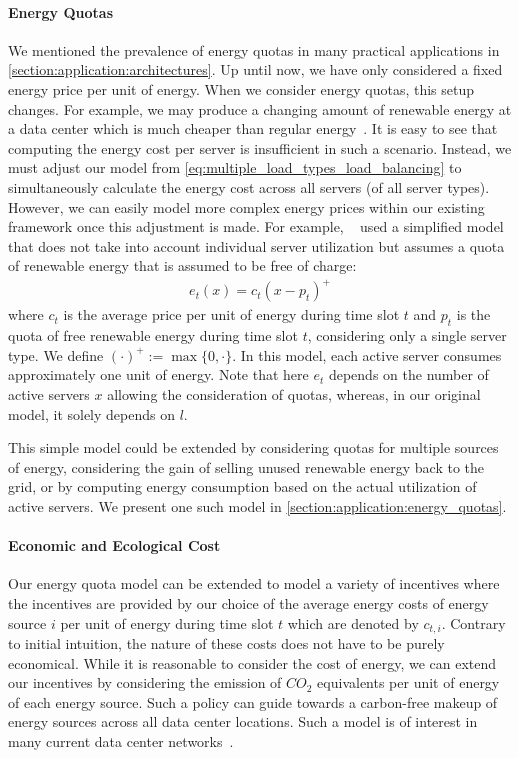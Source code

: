 \paragraph{Energy Quotas} We mentioned the prevalence of energy quotas in many practical applications in \cref{section:application:architectures}. Up until now, we have only considered a fixed energy price per unit of energy. When we consider energy quotas, this setup changes. For example, we may produce a changing amount of renewable energy at a data center which is much cheaper than regular energy~\cite{Lin2012}. It is easy to see that computing the energy cost per server is insufficient in such a scenario. Instead, we must adjust our model from \cref{eq:multiple_load_types_load_balancing} to simultaneously calculate the energy cost across all servers (of all server types). However, we can easily model more complex energy prices within our existing framework once this adjustment is made. For example, \citeauthor*{Lin2012}~\cite{Lin2012} used a simplified model that does not take into account individual server utilization but assumes a quota of renewable energy that is assumed to be free of charge: \begin{align*}
    e_t(x) = c_{t}(x - p_t)^+
\end{align*} where $c_t$ is the average price per unit of energy during time slot $t$ and $p_t$ is the quota of free renewable energy during time slot $t$, considering only a single server type. We define $(\cdot)^+ := \max \{0, \cdot\}$. In this model, each active server consumes approximately one unit of energy. Note that here $e_t$ depends on the number of active servers $x$ allowing the consideration of quotas, whereas, in our original model, it solely depends on $l$.

This simple model could be extended by considering quotas for multiple sources of energy, considering the gain of selling unused renewable energy back to the grid, or by computing energy consumption based on the actual utilization of active servers. We present one such model in \cref{section:application:energy_quotas}.

\paragraph{Economic and Ecological Cost} Our energy quota model can be extended to model a variety of incentives where the incentives are provided by our choice of the average energy costs of energy source $i$ per unit of energy during time slot $t$ which are denoted by $c_{t,i}$. Contrary to initial intuition, the nature of these costs does not have to be purely economical. While it is reasonable to consider the cost of energy, we can extend our incentives by considering the emission of $CO_2$ equivalents per unit of energy of each energy source. Such a policy can guide towards a carbon-free makeup of energy sources across all data center locations. Such a model is of interest in many current data center networks~\cite{Hoelzle2020, Miller2021}.

